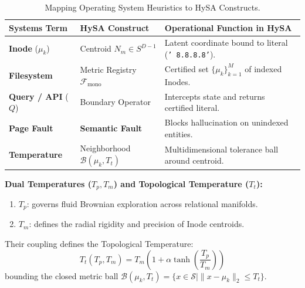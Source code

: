 \documentclass[10pt,twocolumn]{article}
\theoremstyle{definition}
\begin{document}
\begin{table}[t]
\centering
\caption{Mapping Operating System Heuristics to HySA Constructs.}
\label{tab:terminology}
\vspace{0.10cm}
\scriptsize
\setlength{\tabcolsep}{2.0pt}
\begin{tabular}{@{}p{1.9cm}p{2.2cm}p{3.9cm}@{}}
\toprule
\textbf{Systems Term} & \textbf{HySA Construct} & \textbf{Operational Function in HySA} \\ \midrule
\textbf{Inode} ($\mu_k$) & Centroid $N_m \in S^{D-1}$ & Latent coordinate bound to literal (\texttt{' 8.8.8.8'}). \\[2pt]
\textbf{Filesystem} & Metric Registry $\mathcal{F}_{\mathrm{mono}}$ & Certified set $\{\mu_k\}_{k=1}^M$ of indexed Inodes. \\[2pt]
\textbf{Query / API} ($Q$) & Boundary Operator & Intercepts state and returns certified literal. \\[2pt]
\textbf{Page Fault} & \textbf{Semantic Fault} & Blocks hallucination on unindexed entities. \\[2pt]
\textbf{Temperature} & Neighborhood $\mathcal{B}(\mu_k, T_t)$ & Multidimensional tolerance ball around centroid. \\ \bottomrule
\end{tabular}
\end{table}

\textbf{Dual Temperatures ($T_p, T_m$) and Topological Temperature ($T_t$):}
\begin{enumerate}[leftmargin=*, itemsep=1.0pt]
    \item $T_p$: governs fluid Brownian exploration across relational manifolds.
    \item $T_m$: defines the radial rigidity and precision of Inode centroids.
\end{enumerate}
Their coupling defines the Topological Temperature:
\begin{equation}
    T_t(T_p, T_m) = T_m \left( 1 + \alpha \tanh\left( \frac{T_p}{T_m} \right) \right)
\end{equation}
bounding the closed metric ball $\mathcal{B}(\mu_k, T_t) = \{x \in \mathcal{S} \mid \|x - \mu_k\|_2 \le T_t\}$.
\end{document}
